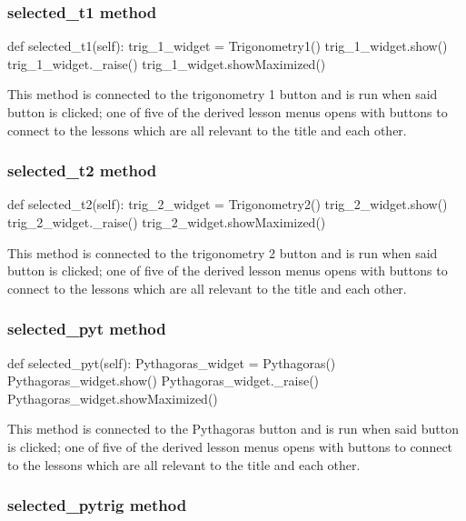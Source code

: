 \subsubsection{selected\_t1 method}

\begin{python}
def selected_t1(self):
        trig_1_widget = Trigonometry1()
        trig_1_widget.show()
        trig_1_widget._raise()
        trig_1_widget.showMaximized()
\end{python}

This method is connected to the trigonometry 1 button and is run when said button is clicked; one of five of the derived lesson menus opens with buttons to connect to the lessons which are all relevant to the title and each other.

\subsubsection{selected\_t2 method}

\begin{python}
def selected_t2(self):
        trig_2_widget = Trigonometry2()
        trig_2_widget.show()
        trig_2_widget._raise()
        trig_2_widget.showMaximized()
\end{python}

This method is connected to the trigonometry 2 button and is run when said button is clicked; one of five of the derived lesson menus opens with buttons to connect to the lessons which are all relevant to the title and each other.

\subsubsection{selected\_pyt method}

\begin{python}
def selected_pyt(self):
        Pythagoras_widget = Pythagoras()
        Pythagoras_widget.show()
        Pythagoras_widget._raise()
        Pythagoras_widget.showMaximized()
\end{python}

This method is connected to the Pythagoras button and is run when said button is clicked; one of five of the derived lesson menus opens with buttons to connect to the lessons which are all relevant to the title and each other.

\subsubsection{selected\_pytrig method}

